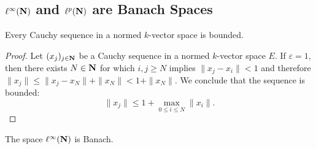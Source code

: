 \subsection{%
  \texorpdfstring{\(\ell^{\infty}(\mathbf{N})\)}{l infinity} and
  \texorpdfstring{\(\ell^p(\mathbf{N})\)}{lp} are Banach Spaces
}

\begin{lemma}
\label{lem:cauchy-bounded}
Every Cauchy sequence in a normed \(k\)-vector space is bounded.
\end{lemma}

\begin{proof}
Let \((x_j)_{j \in \mathbf{N}}\) be a Cauchy sequence in a normed \(k\)-vector space
\(E\). If \(\varepsilon = 1\), then there exists \(N \in \mathbf{N}\) for which \(i, j
\geq N\) implies \(\| x_j - x_i \| < 1\) and therefore \(\| x_j \| \leq \| x_j -
x_N \| + \| x_N \| < 1 + \| x_N \|\). We conclude that the sequence is bounded:
\[
\| x_j \| \leq 1 + \max_{0 \leq i \leq N} \| x_i \|.
\]
\end{proof}

\begin{proposition}
\label{prop:ell-infty-is-banach}
The space \(\ell^{\infty}(\mathbf{N})\) is Banach.
\end{proposition}

